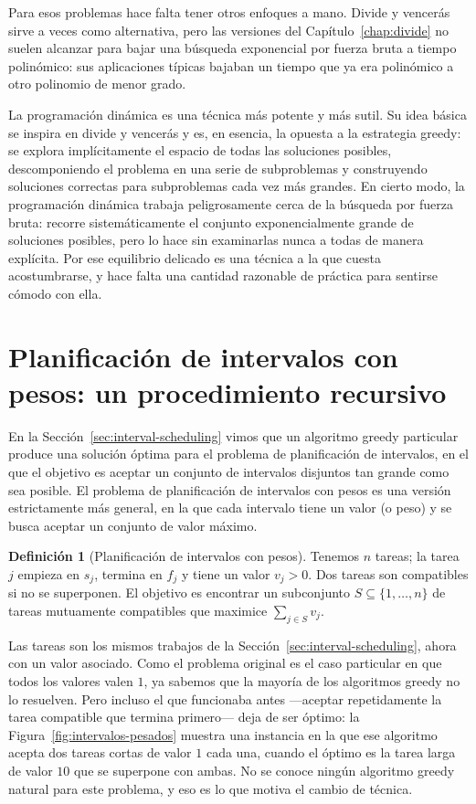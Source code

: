 \documentclass[12pt, spanish, oneside, openany]{book}
\theoremstyle{uprightplain}
\theoremstyle{definition}
\newtheorem{definicion}[teorema]{Definición}
\theoremstyle{remark}
\theoremstyle{definition}
\begin{document}
Para esos problemas hace falta tener otros enfoques a mano. Divide y vencerás sirve a veces como alternativa, pero las versiones del Capítulo~\ref{chap:divide} no suelen alcanzar para bajar una búsqueda exponencial por fuerza bruta a tiempo polinómico: sus aplicaciones típicas bajaban un tiempo que ya era polinómico a otro polinomio de menor grado.

La programación dinámica es una técnica más potente y más sutil. Su idea básica se inspira en divide y vencerás y es, en esencia, la opuesta a la estrategia greedy: se explora implícitamente el espacio de todas las soluciones posibles, descomponiendo el problema en una serie de subproblemas y construyendo soluciones correctas para subproblemas cada vez más grandes. En cierto modo, la programación dinámica trabaja peligrosamente cerca de la búsqueda por fuerza bruta: recorre sistemáticamente el conjunto exponencialmente grande de soluciones posibles, pero lo hace sin examinarlas nunca a todas de manera explícita. Por ese equilibrio delicado es una técnica a la que cuesta acostumbrarse, y hace falta una cantidad razonable de práctica para sentirse cómodo con ella.


\section{Planificación de intervalos con pesos: un procedimiento recursivo}
\label{sec:dp-intervalos}

En la Sección~\ref{sec:interval-scheduling} vimos que un algoritmo greedy particular produce una solución óptima para el problema de planificación de intervalos, en el que el objetivo es aceptar un conjunto de intervalos disjuntos tan grande como sea posible. El problema de planificación de intervalos con pesos es una versión estrictamente más general, en la que cada intervalo tiene un valor (o peso) y se busca aceptar un conjunto de valor máximo.

\begin{definicion}[Planificación de intervalos con pesos]
\label{def:dp-intervalos}
Tenemos $n$ tareas; la tarea $j$ empieza en $s_j$, termina en $f_j$ y tiene un valor $v_j>0$. Dos tareas son compatibles si no se superponen. El objetivo es encontrar un subconjunto $S\subseteq\{1,\dots,n\}$ de tareas mutuamente compatibles que maximice $\sum_{j\in S} v_j$.
\end{definicion}

Las tareas son los mismos trabajos de la Sección~\ref{sec:interval-scheduling}, ahora con un valor asociado. Como el problema original es el caso particular en que todos los valores valen $1$, ya sabemos que la mayoría de los algoritmos greedy no lo resuelven. Pero incluso el que funcionaba antes ---aceptar repetidamente la tarea compatible que termina primero--- deja de ser óptimo: la Figura~\ref{fig:intervalos-pesados} muestra una instancia en la que ese algoritmo acepta dos tareas cortas de valor $1$ cada una, cuando el óptimo es la tarea larga de valor $10$ que se superpone con ambas. No se conoce ningún algoritmo greedy natural para este problema, y eso es lo que motiva el cambio de técnica.
\end{document}
